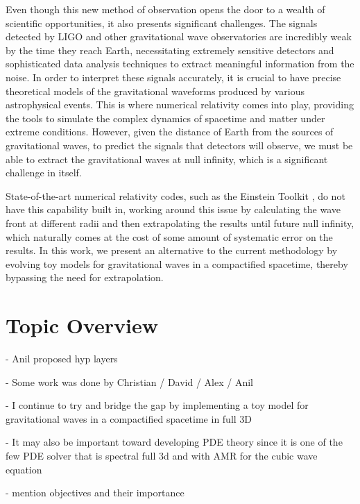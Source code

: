 Even though this new method of observation opens the door to a wealth of scientific opportunities, it also presents significant challenges. The signals detected by LIGO and other gravitational wave observatories are incredibly weak by the time they reach Earth, necessitating extremely sensitive detectors and sophisticated data analysis techniques to extract meaningful information from the noise. In order to interpret these signals accurately, it is crucial to have precise theoretical models of the gravitational waveforms produced by various astrophysical events. This is where numerical relativity comes into play, providing the tools to simulate the complex dynamics of spacetime and matter under extreme conditions. However, given the distance of Earth from the sources of gravitational waves, to predict the signals that detectors will observe, we must be able to extract the gravitational waves at null infinity, which is a significant challenge in itself. 

State-of-the-art numerical relativity codes, such as the Einstein Toolkit \cite{einstein_toolkit_2025}, do not have this capability built in, working around this issue by calculating the wave front at different radii and then extrapolating the results until future null infinity, which naturally comes at the cost of some amount of systematic error on the results. In this work, we present an alternative to the current methodology by evolving toy models for gravitational waves in a compactified spacetime, thereby bypassing the need for extrapolation.


\section{Topic Overview}
\label{section:overview}

- Anil proposed hyp layers

- Some work was done by Christian / David / Alex / Anil

- I continue to try and bridge the gap by implementing a toy model for gravitational waves in a compactified spacetime in full 3D

- It may also be important toward developing PDE theory since it is one of the few PDE solver that is spectral full 3d and with AMR for the cubic wave equation

- mention objectives and their importance

